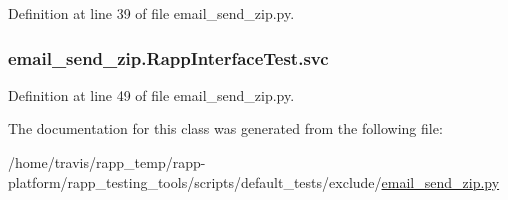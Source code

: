 Definition at line 39 of file email\-\_\-send\-\_\-zip.\-py.

\hypertarget{classemail__send__zip_1_1RappInterfaceTest_a38085ae8bee4a015a82bddeceb34a5dc}{
\subsubsection[{svc}]{\setlength{\rightskip}{0pt plus 5cm}email\-\_\-send\-\_\-zip.\-Rapp\-Interface\-Test.\-svc}}\label{classemail__send__zip_1_1RappInterfaceTest_a38085ae8bee4a015a82bddeceb34a5dc}


Definition at line 49 of file email\-\_\-send\-\_\-zip.\-py.



The documentation for this class was generated from the following file\-:\begin{DoxyCompactItemize}
\item 
/home/travis/rapp\-\_\-temp/rapp-\/platform/rapp\-\_\-testing\-\_\-tools/scripts/default\-\_\-tests/exclude/\hyperlink{email__send__zip_8py}{email\-\_\-send\-\_\-zip.\-py}\end{DoxyCompactItemize}
